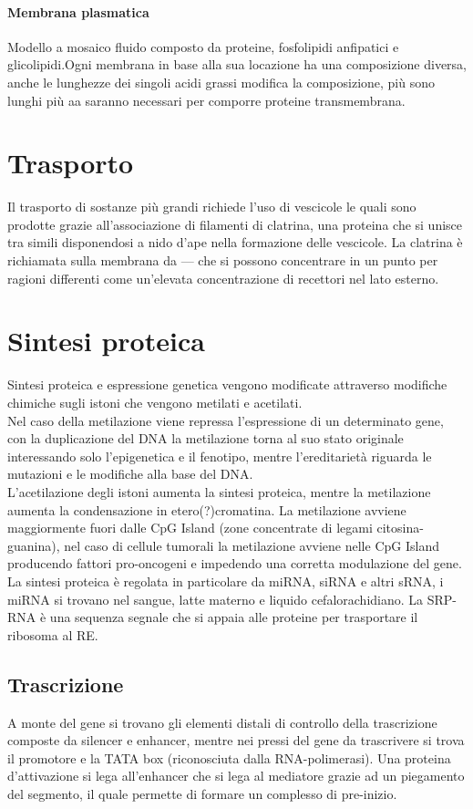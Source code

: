 \documentclass[10pt]{article}
\begin{document}
\paragraph*{Membrana plasmatica} Modello a mosaico fluido composto da proteine, fosfolipidi anfipatici e glicolipidi.Ogni membrana in base alla sua locazione ha una composizione diversa, anche le lunghezze dei singoli acidi grassi modifica la composizione, più sono lunghi più aa saranno necessari per comporre proteine transmembrana. 
\section*{Trasporto}
Il trasporto di sostanze più grandi richiede l'uso di vescicole le quali sono prodotte grazie all'associazione di filamenti di clatrina, una proteina che si unisce tra simili disponendosi a nido d'ape nella formazione delle vescicole. La clatrina è richiamata sulla membrana da --- che si possono concentrare in un punto per ragioni differenti come un'elevata concentrazione di recettori nel lato esterno.
\section*{Sintesi proteica}
Sintesi proteica e espressione genetica vengono modificate attraverso modifiche chimiche sugli istoni che vengono metilati e acetilati.\\
Nel caso della metilazione viene repressa l'espressione di un determinato gene, con la duplicazione del DNA la metilazione torna al suo stato originale interessando solo l'epigenetica e il fenotipo, mentre l'ereditarietà riguarda le mutazioni e le modifiche alla base del DNA.\\
L'acetilazione degli istoni aumenta la sintesi proteica, mentre la metilazione aumenta la condensazione in etero(?)cromatina. La metilazione avviene maggiormente fuori dalle CpG Island (zone concentrate di legami citosina-guanina), nel caso di cellule tumorali la metilazione avviene nelle CpG Island producendo fattori pro-oncogeni e impedendo una corretta modulazione del gene.\\
La sintesi proteica è regolata in particolare da miRNA, siRNA e altri sRNA, i miRNA si trovano nel sangue, latte materno e liquido cefalorachidiano. La SRP-RNA è una sequenza segnale che si appaia alle proteine per trasportare il ribosoma al RE.
\subsection*{Trascrizione} A monte del gene si trovano gli elementi distali di controllo della trascrizione composte da silencer e enhancer, mentre nei pressi del gene da trascrivere si trova il promotore e la TATA box (riconosciuta dalla RNA-polimerasi). Una proteina d'attivazione si lega all'enhancer che si lega al mediatore grazie ad un piegamento del segmento, il quale permette di formare un complesso di pre-inizio.
\end{document}
